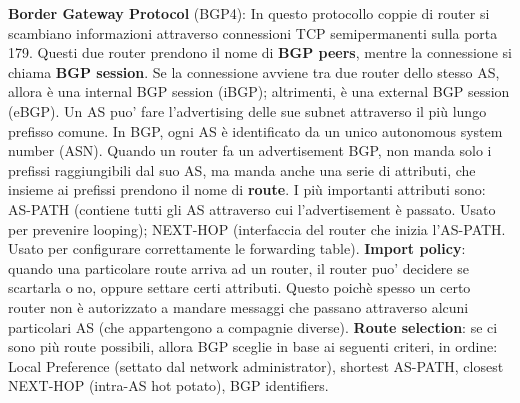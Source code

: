 \documentclass[a4paper,10pt]{article} %
\renewcommand{\b}[1]{%
    {\textbf{#1}}}
\begin{document}
\b{Border Gateway Protocol} (BGP4): In questo protocollo coppie di router si scambiano informazioni attraverso connessioni TCP semipermanenti sulla porta 179. Questi due router prendono il nome di \b{BGP peers}, mentre la connessione si chiama \b{BGP session}. Se la connessione avviene tra due router dello stesso AS, allora è una internal BGP session (iBGP); altrimenti, è una external BGP session (eBGP). Un AS puo' fare l'advertising delle sue subnet attraverso il più lungo prefisso comune. In BGP, ogni AS è identificato da un unico autonomous system number (ASN). Quando un router fa un advertisement BGP, non manda solo i prefissi raggiungibili dal suo AS, ma manda anche una serie di attributi, che insieme ai prefissi prendono il nome di \b{route}. I più importanti attributi sono: AS-PATH (contiene tutti gli AS attraverso cui l'advertisement è passato. Usato per prevenire looping); NEXT-HOP (interfaccia del router che inizia l'AS-PATH. Usato per configurare correttamente le forwarding table). \b{Import policy}: quando una particolare route arriva ad un router, il router puo' decidere se scartarla o no, oppure settare certi attributi. Questo poichè spesso un certo router non è autorizzato a mandare messaggi che passano attraverso alcuni particolari AS (che appartengono a compagnie diverse). \b{Route selection}: se ci sono più route possibili, allora BGP sceglie in base ai seguenti criteri, in ordine:  Local Preference (settato dal network administrator), shortest AS-PATH, closest NEXT-HOP (intra-AS hot potato), BGP identifiers.
\end{document}
